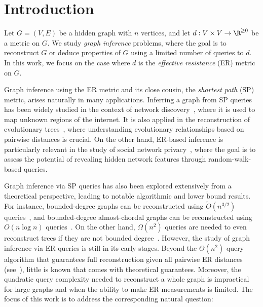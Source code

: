 \section{Introduction}
\label{sec:intro}

Let $G = (V,E)$ be a hidden graph with $n$ vertices, and let $d: V \times V \rightarrow \R^{\geq 0}$ be a metric on $G$.
We study \emph{graph inference} problems, where the goal is to reconstruct $G$ or deduce properties of $G$ using a limited number of queries to $d$. In this work, we focus on the case where $d$ is the \emph{effective resistance} (ER) metric on $G$.

Graph inference using the ER metric and its close cousin, the \emph{shortest path} (SP) metric, arises naturally in many applications. Inferring a graph from SP queries has been widely studied in the context of network discovery~\citep{journals/jsac/BeerlixovaEEHHMR06}, where it is used to map unknown regions of the internet. It is also applied in the reconstruction of evolutionary trees~\citep{hein1989optimal,conf/soda/KingZZ03,journals/ipl/ReyzinS07}, where understanding evolutionary relationships based on pairwise distances is crucial. On the other hand, ER-based inference is particularly relevant in the study of social network privacy~\citep{book/affarwal2014social_network_data,Hoskins2018Inferring}, where the goal is to assess the potential of revealing hidden network features through random-walk-based queries.

Graph inference via SP queries has also been explored extensively from a theoretical perspective, leading to notable algorithmic and lower bound results. For instance, bounded-degree graphs can be reconstructed using $\widetilde{O}(n^{3/2})$ queries~\citep{journals/talg/KannanMZ18}, and bounded-degree almost-chordal graphs can be reconstructed using $O(n \log n)$ queries~\citep{journals/arxiv/bestide2023reconstnolongcycle}. On the other hand, $\Omega(n^2)$ queries are needed to even reconstruct trees if they are not bounded degree~\citep{alt/ReyzinS07}. However, the study of graph inference via ER queries is still in its early stages. Beyond the $\Theta(n^2)$-query algorithm that guarantees full reconstruction given all pairwise ER distances (see~\citep{journals/tcs/WittmannSBT09,Spielman2012TreesRecNotes,Hoskins2018Inferring}), little is known that comes with theoretical guarantees. Moreover, the quadratic query complexity needed to reconstruct a whole graph is impractical for large graphs and when the ability to make ER measurements is limited. The focus of this work is to address the corresponding natural question:

